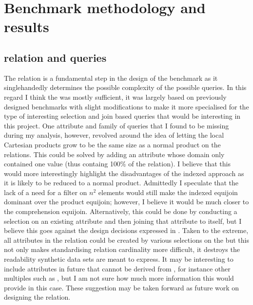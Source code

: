 \section{Benchmark methodology and results}
\subsection{ relation and queries}
The  relation is a fundamental step in the design of
the benchmark as it singlehandedly determines the possible complexity of the
possible queries. In this regard I think the  was mostly
sufficient, it was largely based on previously designed benchmarks with slight
modifications to make it more specialised for the type of interesting
selection and join based queries that would be interesting in this project. One
attribute and family of queries that I found to be missing during my analysis,
however, revolved around the idea of letting the local Cartesian products grow
to be the same size as a normal product on the relations. This could be solved
by adding an attribute  whose domain only
contained one value (thus containg 100\% of the relation). I believe that this
would more interestingly highlight the disadvantages of the indexed approach as
it is likely to be reduced to a normal product. Admittedly I speculate that the lack of a need
for a filter on $n^2$ elements would still make the indexed equijoin dominant
over the product equijoin; however, I believe it would be much closer to the
comprehension equijoin. Alternatively, this could be done by conducting a
selection on an existing attribute and then joining that attribute to itself,
but I believe this goes against the design decisions expressed in
. Taken to the extreme, all
attributes in the relation could be created by various selections on the
 but this not only makes standardising relation
cardinality more difficult, it destroys the readability synthetic data sets are
meant to express. It may be interesting to include attributes in future that
cannot be derived from , for instance other
multiples such as , but I am not sure how much more
information this would provide in this case. These suggestion may be taken
forward as future work on designing the  relation.

